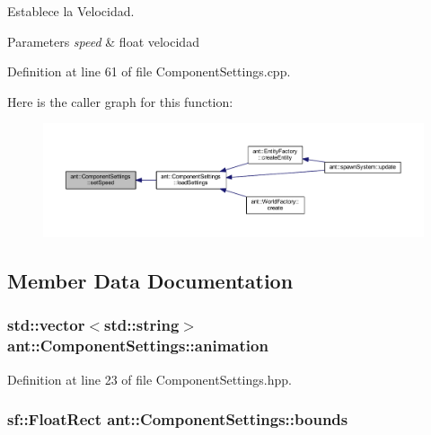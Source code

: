 Establece la Velocidad. 


\begin{DoxyParams}{Parameters}
{\em speed} & float velocidad \\
\hline
\end{DoxyParams}


Definition at line 61 of file Component\+Settings.\+cpp.



Here is the caller graph for this function\+:
\nopagebreak
\begin{figure}[H]
\begin{center}
\leavevmode
\includegraphics[width=350pt]{de/df0/classant_1_1_component_settings_a63c2383733a1a7b51029f055791c5569_icgraph}
\end{center}
\end{figure}




\subsection{Member Data Documentation}
\hypertarget{classant_1_1_component_settings_a31983ef81c97cd5ed7e7fc858dca0790}{
\subsubsection[{animation}]{\setlength{\rightskip}{0pt plus 5cm}std\+::vector$<$std\+::string$>$ ant\+::\+Component\+Settings\+::animation}}\label{classant_1_1_component_settings_a31983ef81c97cd5ed7e7fc858dca0790}


Definition at line 23 of file Component\+Settings.\+hpp.

\hypertarget{classant_1_1_component_settings_a73dafad1f52d54aed792e01c74c4d7d5}{
\subsubsection[{bounds}]{\setlength{\rightskip}{0pt plus 5cm}sf\+::\+Float\+Rect ant\+::\+Component\+Settings\+::bounds}}\label{classant_1_1_component_settings_a73dafad1f52d54aed792e01c74c4d7d5}


